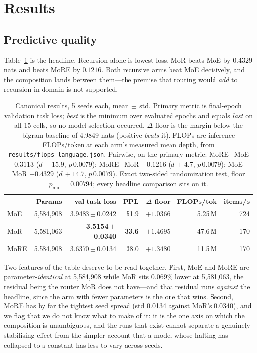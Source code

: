 \section{Results}
\label{sec:results}

\subsection{Predictive quality}
\label{sec:quality}

Table~\ref{tab:main} is the headline. Recursion alone is lowest-loss. MoR beats
MoE by $0.4329$ nats and beats MoRE by $0.1216$. Both recursive arms beat MoE
decisively, and the composition lands between them---the premise that routing
would \emph{add} to recursion in domain is not supported.

\begin{table}[t]
\centering
\small
\caption{Canonical results, 5 seeds each, mean$\,\pm\,$std. Primary metric is
final-epoch validation task loss; \emph{best} is the minimum over evaluated
epochs and equals \emph{last} on all 15 cells, so no model selection occurred.
$\Delta$ floor is the margin below the bigram baseline of 4.9849 nats
(positive \emph{beats} it). FLOPs are inference FLOPs/token at each arm's
measured mean depth, from \texttt{results/flops\_language.json}. Pairwise, on the
primary metric: MoRE$-$MoE $-0.3113$ ($d\,{-}15.9$, $p\,0.0079$); MoRE$-$MoR
$+0.1216$ ($d\,{+}4.7$, $p\,0.0079$); MoE$-$MoR $+0.4329$ ($d\,{+}14.7$,
$p\,0.0079$). Exact two-sided randomization test, floor $p_{\min} = 0.00794$;
every headline comparison sits on it.}
\label{tab:main}
\vspace{2pt}
\begin{tabular}{lrrrrrr}
\toprule
& Params & val task loss & PPL & $\Delta$ floor & FLOPs/tok & items/s \\
\midrule
MoE  & 5{,}584{,}908 & 3.9483\,$\pm$\,0.0242 & 51.9 & $+1.0366$ & 5.25\,M & 724 \\
MoR  & 5{,}581{,}063 & \textbf{3.5154\,$\pm$\,0.0340} & \textbf{33.6} & $+1.4695$ & 47.6\,M & 170 \\
MoRE & 5{,}584{,}908 & 3.6370\,$\pm$\,0.0134 & 38.0 & $+1.3480$ & 11.5\,M & 170 \\
\bottomrule
\end{tabular}
\end{table}

Two features of the table deserve to be read together. First, MoE and MoRE are
parameter-\emph{identical} at 5{,}584{,}908 while MoR sits $0.069\%$ lower at
5{,}581{,}063, the residual being the router MoR does not have---and that residual
runs \emph{against} the headline, since the arm with fewer parameters is the one
that wins. Second, MoRE has by far the tightest seed spread (std 0.0134 against
MoR's 0.0340), and we flag that we do not know what to make of it: it is the one
axis on which the composition is unambiguous, and the runs that exist cannot
separate a genuinely stabilising effect from the simpler account that a model whose
halting has collapsed to a constant has less to vary across seeds.

